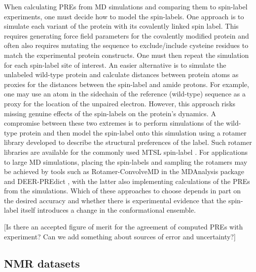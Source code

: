 \documentclass[9pt,review]{livecoms}
\begin{document}
When calculating PREs from MD simulations and comparing them to spin-label experiments, one must decide how to model the spin-labels.
One approach is to simulate each variant of the protein with its covalently linked spin label.
This requires generating force field parameters for the covalently modified protein and often also requires mutating the sequence to exclude/include cysteine residues to match the experimental protein constructs.
One must then repeat the simulation for each spin-label site of interest.
An easier alternative is to simulate the unlabeled wild-type protein and calculate distances between protein atoms as proxies for the distances between the spin-label and amide protons.
For example, one may use an atom in the sidechain of the reference (wild-type) sequence as a proxy for the location of the unpaired electron.
However, this approach risks missing genuine effects of the spin-labels on the protein’s dynamics.
A compromise between these two extremes is to perform simulations of the wild-type protein and then model the spin-label onto this simulation using a rotamer library developed to describe the structural preferences of the label.
Such rotamer libraries are available for the commonly used MTSL spin-label \cite{polyhach_rotamer_2011}.
For applications to large MD simulations, placing the spin-labels and sampling the rotamers may be achieved by tools such as Rotamer-ConvolveMD in the MDAnalysis package \cite{michaud-agrawal_mdanalysis_2011,gowers_mdanalysis_2016} and DEER-PREdict \cite{tesei_deer-predict_2021}, with the latter also implementing calculations of the PREs from the simulations.
Which of these approaches to choose depends in part on the desired accuracy and whether there is experimental evidence that the spin-label itself introduces a change in the conformational ensemble.

[Is there an accepted figure of merit for the agreement of computed PREs with experiment?
Can we add something about sources of error and uncertainty?]

\subsection{NMR datasets}
\label{sub:nmr_data}
\end{document}
